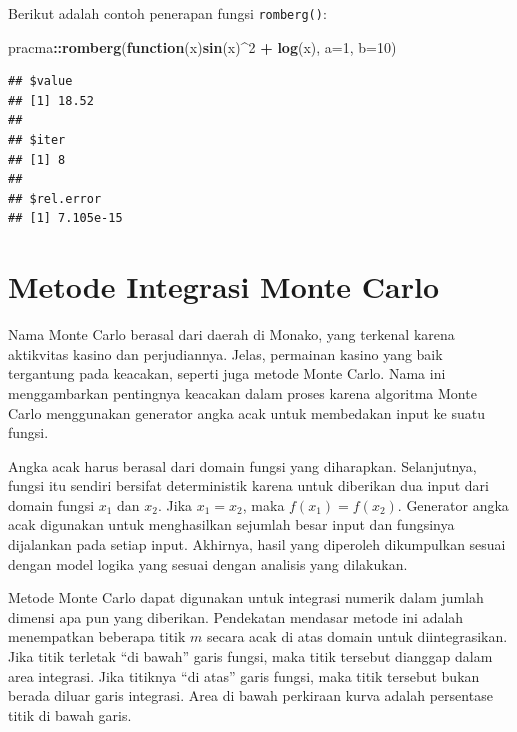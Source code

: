 \documentclass[]{book}
\newenvironment{Shaded}{\begin{snugshade}}{\end{snugshade}}
\newcommand{\ControlFlowTok}[1]{\textcolor[rgb]{0.13,0.29,0.53}{\textbf{#1}}}
\newcommand{\DataTypeTok}[1]{\textcolor[rgb]{0.13,0.29,0.53}{#1}}
\newcommand{\DecValTok}[1]{\textcolor[rgb]{0.00,0.00,0.81}{#1}}
\newcommand{\KeywordTok}[1]{\textcolor[rgb]{0.13,0.29,0.53}{\textbf{#1}}}
\newcommand{\NormalTok}[1]{#1}
\newcommand{\OperatorTok}[1]{\textcolor[rgb]{0.81,0.36,0.00}{\textbf{#1}}}
\newcommand{\StringTok}[1]{\textcolor[rgb]{0.31,0.60,0.02}{#1}}
\theoremstyle{definition}
\theoremstyle{definition}
\theoremstyle{definition}
\theoremstyle{remark}
\begin{document}
Berikut adalah contoh penerapan fungsi \texttt{romberg()}:

\begin{Shaded}
\begin{Highlighting}[]
\NormalTok{pracma}\OperatorTok{::}\KeywordTok{romberg}\NormalTok{(}\ControlFlowTok{function}\NormalTok{(x)}\KeywordTok{sin}\NormalTok{(x)}\OperatorTok{^}\DecValTok{2} \OperatorTok{+}\StringTok{ }\KeywordTok{log}\NormalTok{(x),}
        \DataTypeTok{a=}\DecValTok{1}\NormalTok{, }\DataTypeTok{b=}\DecValTok{10}\NormalTok{)}
\end{Highlighting}
\end{Shaded}

\begin{verbatim}
## $value
## [1] 18.52
## 
## $iter
## [1] 8
## 
## $rel.error
## [1] 7.105e-15
\end{verbatim}

\hypertarget{montecarlo}{%
\section{Metode Integrasi Monte Carlo}\label{montecarlo}}

Nama Monte Carlo berasal dari daerah di Monako, yang terkenal karena aktikvitas kasino dan perjudiannya. Jelas, permainan kasino yang baik tergantung pada keacakan, seperti juga metode Monte Carlo. Nama ini menggambarkan pentingnya keacakan dalam proses karena algoritma Monte Carlo menggunakan generator angka acak untuk membedakan input ke suatu fungsi.

Angka acak harus berasal dari domain fungsi yang diharapkan. Selanjutnya, fungsi itu sendiri bersifat deterministik karena untuk diberikan dua input dari domain fungsi \(x_1\) dan \(x_2\). Jika \(x_1 = x_2\), maka \(f \left(x_1\right) = f \left(x_2\right)\). Generator angka acak digunakan untuk menghasilkan sejumlah besar input dan fungsinya dijalankan pada setiap input. Akhirnya, hasil yang diperoleh dikumpulkan sesuai dengan model logika yang sesuai dengan analisis yang dilakukan.

Metode Monte Carlo dapat digunakan untuk integrasi numerik dalam jumlah dimensi apa pun yang diberikan. Pendekatan mendasar metode ini adalah menempatkan beberapa titik \(m\) secara acak di atas domain untuk diintegrasikan. Jika titik terletak ``di bawah'' garis fungsi, maka titik tersebut dianggap dalam area integrasi. Jika titiknya ``di atas'' garis fungsi, maka titik tersebut bukan berada diluar garis integrasi. Area di bawah perkiraan kurva adalah persentase titik di bawah garis.
\end{document}
